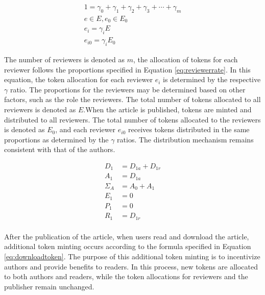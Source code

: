 \documentclass[lettersize,journal]{IEEEtran}
\begin{document}
\begin{equation}
  \begin{aligned}
    1 = \gamma_0 + \gamma_1 + \gamma_2 + \gamma_3 + \cdots + \gamma_m \\
    e \in E, e_0 \in E_0 \\
    e_{i} = \gamma_i E \\
    e_{i0} = \gamma_i E_0
  \end{aligned}
  \label{eq:reviewerrate}
\end{equation}

The number of reviewers is denoted as $m$, the allocation of tokens for each reviewer follows the proportions specified in Equation \ref{eq:reviewerrate}. In this equation, the token allocation for each reviewer $e_i$ is determined by the respective $\gamma$ ratio. The proportions for the reviewers may be determined based on other factors, such as the role the reviewers. The total number of tokens allocated to all reviewers is denoted as $E$.When the article is published, tokens are minted and distributed to all reviewers. The total number of tokens allocated to the reviewers is denoted as $E_0$, and each reviewer $e_{i0}$ receives tokens distributed in the same proportions as determined by the $\gamma$ ratios. The distribution mechanism remains consistent with that of the authors.


\begin{equation}
  \begin{aligned}
    D_1 &= D_{1a} + D_{1r} \\
    A_1 &= D_{1a} \\
    \Sigma_A &= A_0 + A_1 \\
    E_1 &= 0 \\
    P_1 &= 0 \\
    R_1 &= D_{1r} \\
  \end{aligned}
  \label{eq:downloadtoken}
\end{equation}

After the publication of the article, when users read and download the article, additional token minting occurs according to the formula specified in Equation \ref{eq:downloadtoken}. The purpose of this additional token minting is to incentivize authors and provide benefits to readers. In this process, new tokens are allocated to both authors and readers, while the token allocations for reviewers and the publisher remain unchanged.
\end{document}
